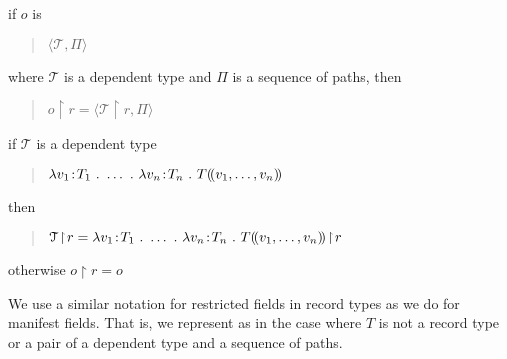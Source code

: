 \begin{shaded}
\begin{ex}
\begin{subex}
  
\item if $o$ is
  \begin{quote}
    $\langle\mathcal{T},\Pi\rangle$
  \end{quote}
  where $\mathcal{T}$ is
  a dependent type and $\Pi$ is a sequence of paths, then
  \begin{quote}
    $o\!\restriction\!r=\langle\mathcal{T}\!\restriction\!r,\Pi\rangle$
  \end{quote}
  
\item if $\mathcal{T}$ is a dependent type
  \begin{quote}
    $\lambda v_1\!:\!T_1\ .\ \ldots\ .\ \lambda v_n\!:\!T_n\ .\
    T(\!(v_1,\ldots,v_n)\!)$
  \end{quote}
  then
  \begin{quote}
    $\mathcal{T}\!\restriction\!r=\lambda v_1\!:\!T_1\ .\ \ldots\ .\
    \lambda v_n\!:\!T_n\ .\ T\dep{v_1,\ldots,v_n}\!\restriction\!r$
  \end{quote}
  
\item otherwise $o\!\restriction\!r=o$
 
\end{subex} 
   
\end{ex} 
  
  
We use a similar notation for restricted fields in record types as we
do for manifest fields.  That is, we represent  as
\nexteg{b} in the case where $T$ is not a record type or a pair of a
dependent type and a sequence of paths.
\begin{ex} 
\begin{subex} 
 
\item {} 
 
\item {} 
 
\end{subex} 
   
\end{ex}



\end{shaded}
